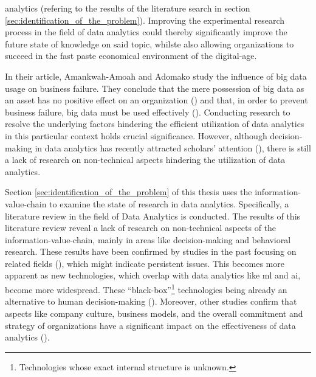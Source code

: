 analytics (refering to the results of the literature search in section \ref{sec:identification_of_the_problem}). Improving the experimental research process in the field of data analytics could thereby significantly improve the future state of knowledge on said topic, whilste also allowing organizations to succeed in the fast paste economical environment of the digital-age.

In their article, Amankwah-Amoah and Adomako study the influence of big data usage on business failure. They conclude that the mere possession of big data as an asset has no positive effect on an organization (\cite{AmankwahAmoah.2019}) and that, in order to prevent business failure, big data must be used effectively (\cite{AmankwahAmoah.2019}). Conducting research to resolve the underlying factors hindering the efficient utilization of data analytics in this particular context holds crucial significance. However, although decision-making in data analytics has recently attracted scholars' attention (\cite{Chen.2022}), there is still a lack of research on non-technical aspects hindering the utilization of data analytics.

Section \ref{sec:identification_of_the_problem} of this thesis uses the information-value-chain to examine the state of research in data analytics. Specifically, a literature review in the field of Data Analytics is conducted. The results of this literature review reveal a lack of research on non-technical aspects of the information-value-chain, mainly in areas like decision-making and behavioral research. These results have been confirmed by studies in the past focusing on related fields (\cite{Trieu.2017}), which might indicate persistent issues. This becomes more apparent as new technologies, which overlap with data analytics like \ac{ml} and \ac{ai}, become more widespread. These \enquote{black-box}\footnote{Technologies whose exact internal structure is unknown.} technologies being already an alternative to human decision-making (\cite{Krakowski.2023}). Moreover, other studies confirm that aspects like company culture, business models, and the overall commitment and strategy of organizations have a significant impact on the effectiveness of data analytics (\cite{Holsapple.2014}).

